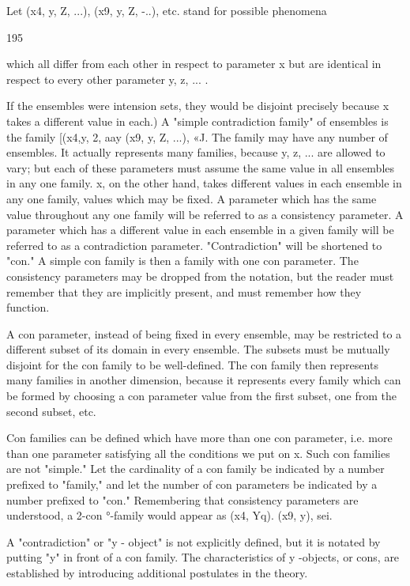 \documentclass[10pt,twoside]{memoir}
\begin{document}
\begin{enumerate}
{{{{Let (x4, y, Z, ...), (x9, y, Z, -..), etc. stand for possible phenomena 


195 


which all differ from each other in respect to parameter x but are identical in 
respect to every other parameter y, z, ... . {If the ensembles were intension 
sets, they would be disjoint precisely because x takes a different value in 
each.) A "simple contradiction family" of ensembles is the family [(x4,y, 2, 
aay (x9, y, Z, ...), «J. The family may have any number of ensembles. It 
actually represents many families, because y, z, ... are allowed to vary; but 
each of these parameters must assume the same value in all ensembles in any 
one family. x, on the other hand, takes different values in each ensemble in 
any one family, values which may be fixed. A parameter which has the same 
value throughout any one family will be referred to as a consistency 
parameter. A parameter which has a different value in each ensemble in a 
given family will be referred to as a contradiction parameter. 
"Contradiction" will be shortened to "con." A simple con family is then a 
family with one con parameter. The consistency parameters may be dropped 
from the notation, but the reader must remember that they are implicitly 
present, and must remember how they function. 

A con parameter, instead of being fixed in every ensemble, may be 
restricted to a different subset of its domain in every ensemble. The subsets 
must be mutually disjoint for the con family to be well-defined. The con 
family then represents many families in another dimension, because it 
represents every family which can be formed by choosing a con parameter 
value from the first subset, one from the second subset, etc. 

Con families can be defined which have more than one con parameter, 
i.e. more than one parameter satisfying all the conditions we put on x. Such 
con families are not "simple." Let the cardinality of a con family be 
indicated by a number prefixed to "family," and let the number of con 
parameters be indicated by a number prefixed to "con." Remembering that 
consistency parameters are understood, a 2-con °-family would appear as 
(x4, Yq). (x9, y), sei. 

A "contradiction" or "y - object" is not explicitly defined, but it is 
notated by putting "y" in front of a con family. The characteristics of y 
-objects, or cons, are established by introducing additional postulates in the 
theory. 

}}}}}
\end{enumerate}
\end{document}
